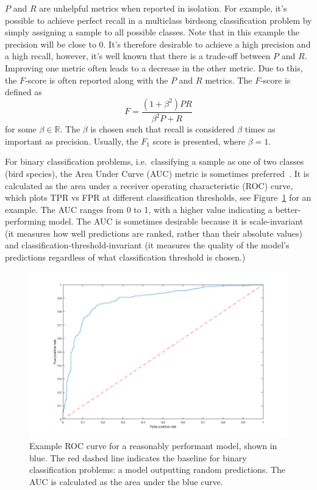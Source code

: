 $P$ and $R$ are unhelpful metrics when reported in isolation. For example, it's
possible to achieve perfect recall in a multiclass birdsong classification
problem by simply assigning a sample to all possible classes. Note that in this
example the precision will be close to 0\@. It's therefore desirable to achieve
a high precision and a high recall, however, it's well known that there is a
trade-off between $P$ and $R$. Improving one metric often leads to a decrease in
the other metric. Due to this, the $F$-score is often reported along with the
$P$ and $R$ metrics. The $F$-score is defined as
\begin{equation}
F = \frac{(1+\beta^2)PR}{\beta^2P + R}
\end{equation}
for some $\beta \in \mathbb{R}$. The $\beta$ is chosen such that recall is
considered $\beta$ times as important as precision. Usually, the $F_1$ score is
presented, where $\beta = 1$.

For binary classification problems, i.e.\ classifying a sample as one of two
classes (bird species), the Area Under Curve (AUC) metric is sometimes
preferred~\cite{leng2014multi}. It is calculated as the area under a receiver
operating characteristic (ROC) curve, which plots TPR vs FPR at different
classification thresholds, see Figure~\ref{fig:roc} for an example. The AUC
ranges from 0 to 1, with a higher value indicating a better-performing model.
The AUC is sometimes desirable because it is scale-invariant (it measures how
well predictions are ranked, rather than their absolute values) and
classification-threshold-invariant (it measures the quality of the model's
predictions regardless of what classification threshold is chosen.)

\begin{figure}[ht]
  \centering
  \includegraphics[width=\textwidth]{figures/roc.png}
  \caption{Example ROC curve for a reasonably performant model, shown in blue.
  The red dashed line indicates the baseline for binary classification problems:
a model outputting random predictions. The AUC is calculated as the area under
the blue curve.}\label{fig:roc}
\end{figure}

